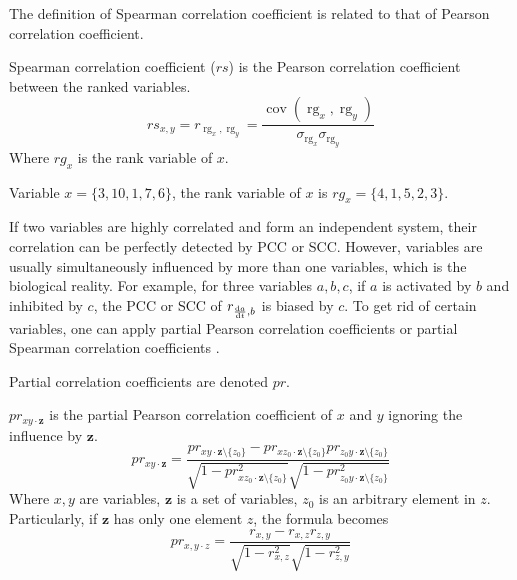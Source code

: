 The definition of Spearman correlation coefficient is related to that of Pearson correlation coefficient.

\begin{definition}
    Spearman correlation coefficient ($rs$) is the Pearson correlation coefficient between the ranked variables.
    $${\displaystyle rs_{x,y}=r_{\operatorname {rg} _{x},\operatorname {rg} _{y}}={\frac {\operatorname {cov} (\operatorname {rg} _{x},\operatorname {rg} _{y})}{\sigma _{\operatorname {rg} _{x}}\sigma _{\operatorname {rg} _{y}}}}}$$
    Where $rg_x$ is the rank variable of $x$.
\end{definition}

\begin{example}
Variable $x=\{3,10,1,7,6\}$, the rank variable of $x$ is $rg_x=\{4,1,5,2,3\}$.
\end{example}


If two variables are highly correlated and form an independent system, their correlation can be perfectly detected by PCC or SCC.
However, variables are usually simultaneously influenced by more than one variables, which is the biological reality.
For example, for three variables $a,b,c$, if $a$ is activated by $b$ and inhibited by $c$, the PCC or SCC of $r_{\frac{{\rm d}a}{{\rm d}t},b}$ is biased by $c$. 
To get rid of certain variables, one can apply partial Pearson correlation coefficients \cite{baba2004partial} or partial Spearman correlation coefficients \cite{borror2001practical}.

Partial correlation coefficients are denoted $pr$.

\begin{definition}
    $pr_{xy\cdot \mathbf {z}}$ is the partial Pearson correlation coefficient of $x$ and $y$ ignoring the influence by $\mathbf {z}$.
    $$pr _{xy\cdot \mathbf {z} }={\frac {pr _{xy\cdot \mathbf {z} \setminus \{z_{0}\}}-pr _{xz_{0}\cdot \mathbf {z} \setminus \{z_{0}\}}pr _{z_{0}y\cdot \mathbf {z} \setminus \{z_{0}\}}}{{\sqrt {1-pr _{xz_{0}\cdot \mathbf {z} \setminus \{z_{0}\}}^{2}}}{\sqrt {1-pr _{z_{0}y\cdot \mathbf {z} \setminus \{z_{0}\}}^{2}}}}}$$
    Where $x,y$ are variables, $\mathbf {z}$ is a set of variables, $z_0$ is an arbitrary element in $z$. 
    Particularly, if $\mathbf {z}$ has only one element $z$, the formula becomes
    $$pr_{x,y\cdot z}={\frac {r _{x,y}-r _{x,z}r _{z,y}}{{\sqrt {1-r _{x,z}^{2}}}{\sqrt {1-r _{z,y}^{2}}}}}$$

\end{definition}

